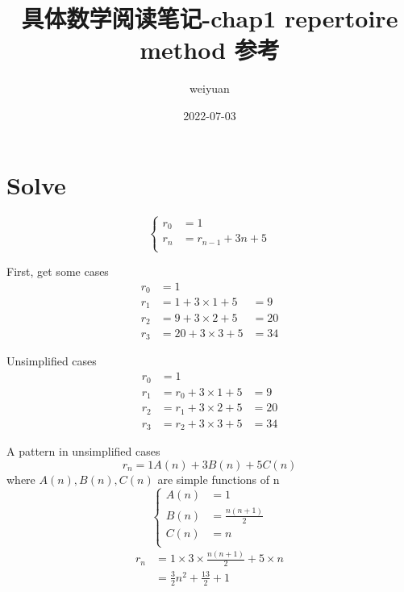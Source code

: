 \documentclass[mode=geye]{elegantnote}
\title{具体数学阅读笔记-chap1 repertoire method 参考}
\author{weiyuan}
\date{2022-07-03}
\begin{document}
\maketitle
\section{Solve}
\begin{equation*}
    \left\{
        \begin{array}{ll}
            r_0 &= 1\\
            r_n &= r_{n-1}+3n+5\\ 
        \end{array}
    \right.
\end{equation*}

First, get some cases
\begin{align*}
    r_0 &= 1 & \\
    r_1 &= 1+3\times 1 + 5 &= 9  \\
    r_2 &= 9+3\times 2 + 5 &= 20 \\
    r_3 &= 20+3\times 3 + 5 &= 34 
\end{align*}

Unsimplified cases
\begin{align*}
    r_0 &= 1 & \\
    r_1 &= r_0+3\times 1 + 5 &= 9  \\
    r_2 &= r_1+3\times 2 + 5 &= 20 \\
    r_3 &= r_2+3\times 3 + 5 &= 34 
\end{align*}

A pattern in unsimplified cases
\begin{equation*}
    r_n = 1 A(n) + 3 B(n) +5 C(n)
\end{equation*}
where $ A(n), B(n), C(n) $ are simple functions of n
\begin{equation*}
    \left\{
        \begin{array}{ll}
            A(n) &= 1\\
            B(n) &= \frac{n(n+1)}{2}\\
            C(n) &= n\\
        \end{array}
    \right.
\end{equation*}
\begin{align*}
    r_n &= 1 \times 3 \times \frac{n(n+1)}{2} +5 \times n\\
        &= \frac{3}{2}n^2 +\frac{13}{2}+1
\end{align*}
\end{document}
